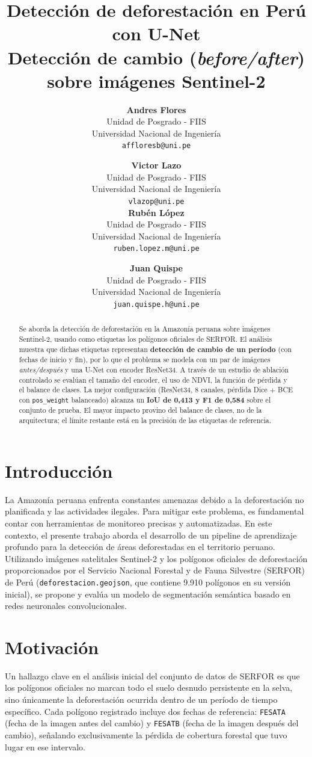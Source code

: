 \documentclass{article}
\title{\textbf{Detección de deforestación en Perú con U-Net}\\
\large Detección de cambio (\textit{before/after}) sobre imágenes Sentinel-2}
\author{%
  \textbf{Andres Flores} \\
  Unidad de Posgrado - FIIS \\
  Universidad Nacional de Ingeniería \\
  \texttt{affloresb@uni.pe} \\
  \and
  \textbf{Victor Lazo} \\
  Unidad de Posgrado - FIIS \\
  Universidad Nacional de Ingeniería \\
  \texttt{vlazop@uni.pe} \\
  \AND %
  \textbf{Rubén López} \\
  Unidad de Posgrado - FIIS \\
  Universidad Nacional de Ingeniería \\
  \texttt{ruben.lopez.m@uni.pe} \\
  \and
  \textbf{Juan Quispe} \\
  Unidad de Posgrado - FIIS \\
  Universidad Nacional de Ingeniería \\
  \texttt{juan.quispe.h@uni.pe}
}
\begin{document}
\maketitle

\begin{abstract}
\noindent
Se aborda la detección de deforestación en la Amazonía peruana sobre imágenes
Sentinel-2, usando como etiquetas los polígonos oficiales de SERFOR. El análisis muestra
que dichas etiquetas representan \textbf{detección de cambio de un período} (con fechas de
inicio y fin), por lo que el problema se modela con un par de imágenes \emph{antes/después}
y una U-Net con encoder ResNet34. A través de un estudio de ablación controlado se evalúan
el tamaño del encoder, el uso de NDVI, la función de pérdida y el balance de clases. La
mejor configuración (ResNet34, 8 canales, pérdida Dice + BCE con \texttt{pos\_weight}
balanceado) alcanza un \textbf{IoU de 0,413 y F1 de 0,584} sobre el conjunto de prueba. El
mayor impacto provino del balance de clases, no de la arquitectura; el límite restante está
en la precisión de las etiquetas de referencia.
\end{abstract}

\section{Introducción}
La Amazonía peruana enfrenta constantes amenazas debido a la deforestación no planificada y las actividades ilegales. Para mitigar este problema, es fundamental contar con herramientas de monitoreo precisas y automatizadas. En este contexto, el presente trabajo aborda el desarrollo de un pipeline de aprendizaje profundo para la detección de áreas deforestadas en el territorio peruano. Utilizando imágenes satelitales Sentinel-2 y los polígonos oficiales de deforestación proporcionados por el Servicio Nacional Forestal y de Fauna Silvestre (SERFOR) de Perú (\texttt{deforestacion.geojson}, que contiene 9.910 polígonos en su versión inicial), se propone y evalúa un modelo de segmentación semántica basado en redes neuronales convolucionales.

\section{Motivación}
Un hallazgo clave en el análisis inicial del conjunto de datos de SERFOR es que los polígonos oficiales no marcan todo el suelo desnudo persistente en la selva, sino únicamente la deforestación ocurrida dentro de un período de tiempo específico. Cada polígono registrado incluye dos fechas de referencia: \texttt{FESATA} (fecha de la imagen antes del cambio) y \texttt{FESATB} (fecha de la imagen después del cambio), señalando exclusivamente la pérdida de cobertura forestal que tuvo lugar en ese intervalo.
\end{document}
